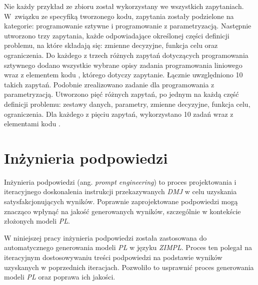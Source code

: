 Nie każdy przykład ze zbioru został wykorzystany we wszystkich zapytaniach. W~związku ze specyfiką tworzonego kodu, zapytania zostały podzielone na kategorie: programowanie sztywne i programowanie z parametryzacją. Następnie utworzono trzy zapytania, każde odpowiadające określonej części definicji problemu, na które składają się: zmienne decyzyjne, funkcja celu oraz ograniczenia. Do każdego z trzech różnych zapytań dotyczących programowania sztywnego %
dodano wszystkie wybrane opisy zadania programowania liniowego
wraz z elementem kodu  , którego dotyczy zapytanie. Łącznie uwzględniono 10 takich zapytań. Podobnie zrealizowano zadanie dla programowania z parametryzacją. Utworzono pięć różnych zapytań, po jednym na każdą część definicji problemu: zestawy danych, parametry, zmienne decyzyjne, funkcja celu, ograniczenia. Dla każdego z pięciu zapytań, wykorzystano 10 zadań wraz z elementami kodu  . %


\section{Inżynieria podpowiedzi}
Inżynieria podpowiedzi (ang. \textit{prompt engineering}) to proces projektowania i iteracyjnego doskonalenia instrukcji przekazywanych \textit{DMJ} w celu uzyskania satysfakcjonujących wyników. Poprawnie zaprojektowane podpowiedzi mogą znacząco wpłynąć na jakość generowanych wyników, szczególnie w kontekście złożonych modeli \textit{PL}.

W niniejszej pracy inżynieria podpowiedzi została zastosowana do automatycznego generowania modeli \textit{PL} w języku \textit{ZIMPL}. Proces ten polegał na iteracyjnym dostosowywaniu treści podpowiedzi na podstawie wyników uzyskanych w poprzednich iteracjach. Pozwoliło to usprawnić proces generowania modeli \textit{PL} oraz poprawa ich jakości.

